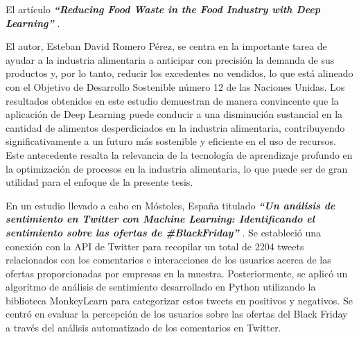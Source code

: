 
\vspace{1\baselineskip}
El artículo \textbf{\textit{ “Reducing Food Waste in the Food Industry with Deep Learning” }}\cite{afanador2022diseno}. 

El autor, Esteban David Romero Pérez, se centra en la importante tarea de ayudar a la industria alimentaria a anticipar con precisión la demanda de sus productos y, por lo tanto, reducir los excedentes no vendidos, lo que está alineado con el Objetivo de Desarrollo Sostenible número 12 de las Naciones Unidas. Los resultados obtenidos en este estudio demuestran de manera convincente que la aplicación de Deep Learning puede conducir a una disminución sustancial en la cantidad de alimentos desperdiciados en la industria alimentaria, contribuyendo significativamente a un futuro más sostenible y eficiente en el uso de recursos. Este antecedente resalta la relevancia de la tecnología de aprendizaje profundo en la optimización de procesos en la industria alimentaria, lo que puede ser de gran utilidad para el enfoque de la presente tesis.




\vspace{1\baselineskip}
En un estudio llevado a cabo en Móstoles, España titulado \textbf{\textit{“Un análisis de sentimiento en Twitter con Machine Learning: Identificando el sentimiento sobre las ofertas de \#BlackFriday” }}\cite{saura2018analisis}. Se estableció una conexión con la API de Twitter para recopilar un total de 2204 tweets relacionados con los comentarios e interacciones de los usuarios acerca de las ofertas proporcionadas por empresas en la muestra. Posteriormente, se aplicó un algoritmo de análisis de sentimiento desarrollado en Python utilizando la biblioteca MonkeyLearn para categorizar estos tweets en positivos y negativos. Se centró en evaluar la percepción de los usuarios sobre las ofertas del Black Friday a través del análisis automatizado de los comentarios en Twitter.

